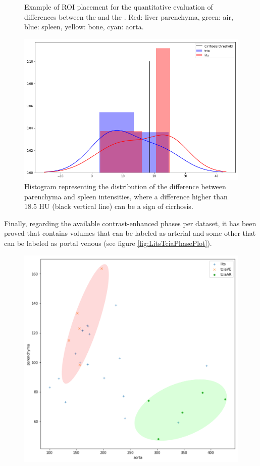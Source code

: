 {\begin{figure}[!ht]
\begin{mdframed}[backgroundcolor=blue!50,linecolor=blue!50]
		\caption{Example of ROI placement for the quantitative evaluation of differences between the \textbf{} and the \textbf{}. Red: liver parenchyma, green: air, blue: spleen, yellow: bone, cyan: aorta.}
		\label{fig:roiPlacement}
	\end{mdframed}
\end{figure}
\begin{figure}[!ht]
	\begin{mdframed}[backgroundcolor=blue!50,linecolor=blue!50]
		\centering
		\includegraphics[width=0.6\linewidth]{images/LITS_TCIA_cirrhosisPlot}
		\caption{Histogram representing the distribution of the difference between parenchyma and spleen intensities, where a difference higher than 18.5 HU (black vertical line) can be a sign of cirrhosis.}
		\label{fig:cirrhosisPlot}
	\end{mdframed}
\end{figure}
Finally, regarding the available contrast-enhanced phases per dataset, it has been proved that \textbf{} contains volumes that can be labeled as arterial and some other that can be labeled as portal venous (see figure \ref{fig:LitsTciaPhasePlot}).
\begin{figure}[!ht]
	\begin{mdframed}[backgroundcolor=blue!50,linecolor=blue!50]
		\centering
		\includegraphics[width=0.6\linewidth]{images/AortaParPlot}

\end{mdframed}
\end{figure}}
